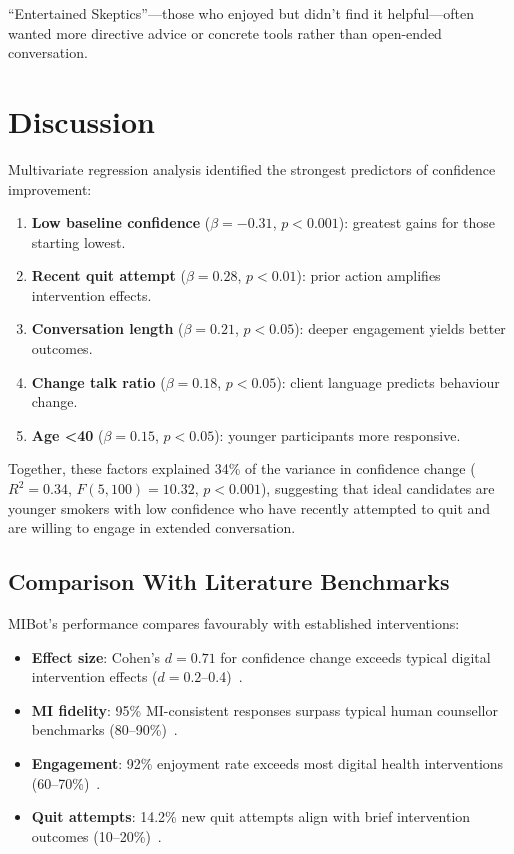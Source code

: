 ``Entertained Skeptics''---those who enjoyed but didn't find it helpful---often wanted more directive advice or concrete tools rather than open-ended conversation.


\section{Discussion}
\label{sec:synthesis}



Multivariate regression analysis identified the strongest predictors of confidence improvement:

\begin{enumerate}
	\item \textbf{Low baseline confidence} ($\beta = -0.31$, $p < 0.001$): greatest gains for those starting lowest.
	\item \textbf{Recent quit attempt} ($\beta = 0.28$, $p < 0.01$): prior action amplifies intervention effects.
	\item \textbf{Conversation length} ($\beta = 0.21$, $p < 0.05$): deeper engagement yields better outcomes.
	\item \textbf{Change talk ratio} ($\beta = 0.18$, $p < 0.05$): client language predicts behaviour change.
	\item \textbf{Age <40} ($\beta = 0.15$, $p < 0.05$): younger participants more responsive.
\end{enumerate}

Together, these factors explained 34\% of the variance in confidence change ($R^2 = 0.34$, $F(5,100) = 10.32$, $p < 0.001$), suggesting that ideal candidates are younger smokers with low confidence who have recently attempted to quit and are willing to engage in extended conversation.

\subsection*{Comparison With Literature Benchmarks}

MIBot's performance compares favourably with established interventions:

\begin{itemize}
	\item \textbf{Effect size}: Cohen's $d=0.71$ for confidence change exceeds typical digital intervention effects ($d=0.2$--0.4)~\citep{Whittaker2016}.
	\item \textbf{MI fidelity}: 95\% MI-consistent responses surpass typical human counsellor benchmarks (80--90\%)~\citep{Moyers2016}.
	\item \textbf{Engagement}: 92\% enjoyment rate exceeds most digital health interventions (60--70\%)~\citep{Perski2017}.
	\item \textbf{Quit attempts}: 14.2\% new quit attempts align with brief intervention outcomes (10--20\%)~\citep{Stead2013}.
\end{itemize}

